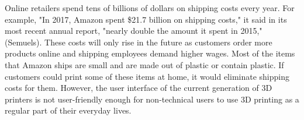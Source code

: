 Online retailers spend tens of billions of dollars on shipping costs every year. For example, "In 2017, Amazon spent \$21.7 billion on shipping costs," it said in its most recent annual report, "nearly double the amount it spent in 2015," (Semuels). These costs will only rise in the future as customers order more products online and shipping employees demand higher wages. Most of the items that Amazon ships are small and are made out of plastic or contain plastic. If customers could print some of these items at home, it would eliminate shipping costs for them. However, the user interface of the current generation of 3D printers is not user-friendly enough for non-technical users to use 3D printing as a regular part of their everyday lives.